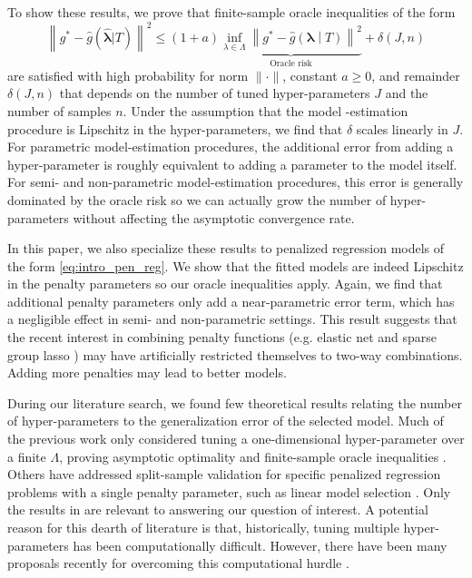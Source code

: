 \documentclass[12pt]{article} %
\theoremstyle{definition}
\begin{document}
To show these results, we prove that finite-sample oracle inequalities of the form
\begin{equation}
\label{thrm:intro_oracle_ineq}
\left \| g^* - \hat{g} (\hat{\boldsymbol{\lambda}} | T ) \right \|^2
\le
(1+a)
\underbrace{\inf_{\lambda \in \Lambda} \left \| g^* - \hat{g}\left (\boldsymbol{\lambda} \middle | T \right ) \right \|^2}_{\text{Oracle risk}}
+ \delta \left(J,n\right)
\end{equation}
are satisfied with high probability for norm $\| \cdot \|$, constant $a \ge 0$, and remainder $\delta(J,n)$ that depends on the number of tuned hyper-parameters $J$ and the number of samples $n$.
Under the assumption that the model -estimation procedure is Lipschitz in the hyper-parameters, we find that $\delta$ scales linearly in $J$.
For parametric model-estimation procedures, the additional error from adding a hyper-parameter is roughly equivalent to adding a parameter to the model itself.
For semi- and non-parametric model-estimation procedures, this error is generally dominated by the oracle risk so we can actually grow the number of hyper-parameters without affecting the asymptotic convergence rate.

In this paper, we also specialize these results to penalized regression models of the form \eqref{eq:intro_pen_reg}.
We show that the fitted models are indeed Lipschitz in the penalty parameters so our oracle inequalities apply. 
Again, we find that additional penalty parameters only add a near-parametric error term, which has a negligible effect in semi- and non-parametric settings. This result suggests that the recent interest in combining penalty functions (e.g. elastic net and sparse group lasso \citep{zou2003regression, simon2013sparse}) may have artificially restricted themselves to two-way combinations. Adding more penalties may lead to better models.

During our literature search, we found few theoretical results relating the number of hyper-parameters to the generalization error of the selected model. 
Much of the previous work only considered tuning a one-dimensional hyper-parameter over a finite $\Lambda$, proving asymptotic optimality \citep{van2004asymptotic} and finite-sample oracle inequalities \citep{van2003unified, gyorfi2006distribution}. Others have addressed split-sample validation for specific penalized regression problems with a single penalty parameter, such as linear model selection \citep{li1987asymptotic, shao1997asymptotic, golub1979generalized, chetverikov2016cross, chatterjee2015prediction}.
Only the results in \citet{lecue2012oracle} are relevant to answering our question of interest. A potential reason for this dearth of literature is that, historically, tuning multiple hyper-parameters has been computationally difficult. However, there have been many proposals recently for overcoming this computational hurdle \citep{bengio2000gradient, foo2008efficient, snoek2012practical}.
\end{document}
